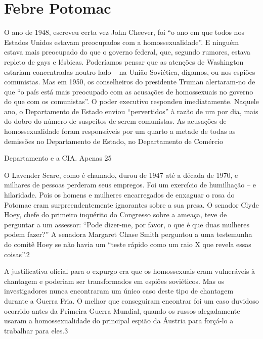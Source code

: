 \chapter{Febre Potomac}\label{Febre Potomac}
 \par 
O ano de 1948, escreveu certa vez John Cheever, foi “o ano em que todos nos Estados Unidos estavam preocupados com a homossexualidade”. E ninguém estava mais preocupado do que o governo federal, que, segundo rumores, estava repleto de gays e lésbicas. Poderíamos pensar que as atenções de Washington estariam concentradas noutro lado – na União Soviética, digamos, ou nos espiões comunistas. Mas em 1950, os conselheiros do presidente Truman alertaram-no de que “o país está mais preocupado com as acusações de homossexuais no governo do que com os comunistas”. O poder executivo respondeu imediatamente. Naquele ano, o Departamento de Estado enviou “pervertidos” à razão de um por dia, mais do dobro do número de suspeitos de serem comunistas. As acusações de homossexualidade foram responsáveis ​​por um quarto a metade de todas as demissões no Departamento de Estado, no Departamento de Comércio
 \par 
Departamento e a CIA. Apenas 25%
 \par 
O Lavender Scare, como é chamado, durou de 1947 até a década de 1970, e milhares de pessoas perderam seus empregos. Foi um exercício de humilhação – e hilaridade. Pois os homens e mulheres encarregados de enxaguar o rosa do Potomac eram surpreendentemente ignorantes sobre a sua presa. O senador Clyde Hoey, chefe do primeiro inquérito do Congresso sobre a ameaça, teve de perguntar a um assessor: “Pode dizer-me, por favor, o que é que duas mulheres podem fazer?” A senadora Margaret Chase Smith perguntou a uma testemunha do comitê Hoey se não havia um “teste rápido como um raio X que revela essas coisas”.{\color{blue}2}
 \par 
A justificativa oficial para o expurgo era que os homossexuais eram vulneráveis ​​à chantagem e poderiam ser transformados em espiões soviéticos. Mas os investigadores nunca encontraram um único caso deste tipo de chantagem durante a Guerra Fria. O melhor que conseguiram encontrar foi um caso duvidoso ocorrido antes da Primeira Guerra Mundial, quando os russos alegadamente usaram a homossexualidade do principal espião da Áustria para forçá-lo a trabalhar para eles.{\color{blue}3}
 \par 
